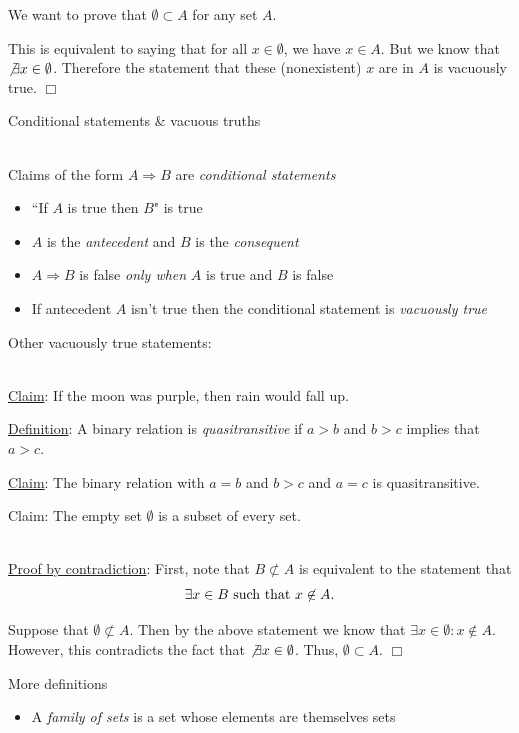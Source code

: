 \documentclass[10pt]{seminar}
\begin{document}
\begin{slide}
We want to prove that $\emptyset \subset A$ for any set $A$.

This is equivalent to saying that for all $x\in \emptyset$, we have $ x\in A$.  But we know that $\not\exists x\in \emptyset$.  Therefore the statement that these (nonexistent) $x$ are in $A$ is vacuously true.  $\Box$

\newslide
Conditional statements \& vacuous truths

\ \\Claims of the form $A\Rightarrow B$ are \textit{conditional statements}

\begin{itemize}
\item ``If $A$ is true then $B$" is true
\item $A$ is the \textit{antecedent} and $B$ is the \textit{consequent}
\item $A\Rightarrow B$ is false \textit{only when} $A$ is true and $B$ is false 
\item If antecedent $A$ isn't true then the conditional statement is \textit{vacuously true}
\end{itemize}


\newslide
Other vacuously true statements:

\ \\ \underline{Claim}: If the moon was purple, then rain would fall up.

\vspace{.2in}

\underline{Definition}: A binary relation is \textit{quasitransitive} if $a>b$ and $b>c$ implies that $a>c$.

\underline{Claim}: The binary relation with $a=b$ and $b>c$ and $a=c$ is quasitransitive.

\newslide

Claim:  The empty set $\emptyset$ is a subset of every set.

\ \\\underline{Proof by contradiction}: First, note that $B\not\subset A$ is equivalent to the statement that $$\exists x\in B \hbox{ such that } x\not\in A. $$

Suppose that $\emptyset \not\subset A$.  Then by the above statement we know that $\exists x\in \emptyset: x\not\in A$.  However, this contradicts the fact that $\not\exists x\in \emptyset$.  Thus, $\emptyset\subset A$.   $\Box$

\newslide More definitions

\begin{itemize}
\item A \textit{family of sets} is a set whose elements are themselves sets


\end{itemize}
\end{slide}
\end{document}
